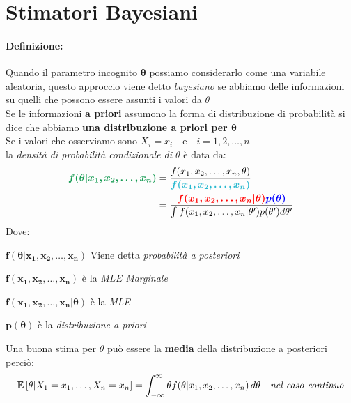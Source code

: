 \documentclass[]{article}
\makeatletter
\def\mathcolor#1#{\@mathcolor{#1}}
\def\@mathcolor#1#2#3{%
  \protect\leavevmode
  \begingroup
    \color#1{#2}#3%
  \endgroup
}
\newcommand{\ev}{\mathbb{E}[X]}
\renewcommand{\ev}[1]{\mathbb{E}\left[#1\right]}
\newcommand{\definizione}{\paragraph{Definizione:}}
\makeatother
\begin{document}
    \section{Stimatori Bayesiani}
    \definizione Quando il parametro incognito $\boldsymbol{\theta}$ possiamo considerarlo come una variabile aleatoria, questo approccio viene detto \textit{bayesiano} se abbiamo delle informazioni su quelli che possono essere assunti i valori da $\theta$ \\
    Se le informazioni \textbf{a priori} assumono la forma di distribuzione di probabilità si dice che abbiamo \textbf{una distribuzione a priori per $\boldsymbol{\theta}$} \\[2ex]
    Se i valori che osserviamo sono $X_i = x_i \quad \text{e} \quad i=1,2, \ldots, n$ \\
    la \textit{densità di probabilità condizionale di $\theta$} è data da:
    \begin{equation*}
        \begin{split}
            \mathcolor{ForestGreen}{\boldsymbol{f(\theta \rvert x_1, x_2, \ldots, x_n)}} &= \frac{f(x_1, x_2, \ldots, x_n, \theta)}{\mathcolor{Turquoise}{\boldsymbol{f(x_1, x_2, \ldots, x_n)}}} \\
            &= \frac{\mathcolor{red}{\boldsymbol{f(x_1, x_2, \ldots, x_n \rvert \theta)}} \mathcolor{blue}{\boldsymbol{p(\theta)}}}{\int_{}^{} f(x_1, x_2, \ldots, x_n \rvert \theta') p(\theta') d\theta'}
        \end{split}
    \end{equation*}
    Dove:
    \begin{itemize}
        {\color{ForestGreen} \item $\boldsymbol{f(\theta \rvert x_1, x_2, \ldots, x_n)}$ Viene detta \textit{probabilità a posteriori}}
        {\color{Turquoise} \item $\boldsymbol{f(x_1, x_2, \ldots, x_n)}$ è la \textit{MLE Marginale}}
        {\color{red} \item $\boldsymbol{f(x_1, x_2, \ldots, x_n \rvert \theta)}$ è la \textit{MLE}}
        {\color{blue} \item $\boldsymbol{p(\theta)}$ è la \textit{distribuzione a priori}}
    \end{itemize}
    Una buona stima per $\theta$ può essere la \textbf{media} della distribuzione a posteriori perciò:
    \[ \ev{\theta \rvert X_1 = x_1, \ldots, X_n = x_n} = \int_{-\infty}^{\infty} \theta f(\theta \rvert x_1, x_2, \ldots, x_n) \, d\theta \quad \text{\textit{nel caso continuo}} \]
\end{document}
